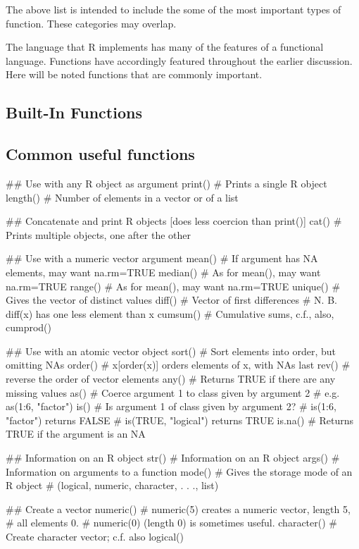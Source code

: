 The above list is intended to include the some of the most important
types of function.  These categories may overlap.

The language that R implements has many of the features
of  a
functional language. Functions have accordingly featured throughout
the earlier discussion.  Here will be noted functions that are
commonly important.

\subsection{Built-In Functions}\label{ss:built-in}

\subsection*{Common useful functions}

\begin{fullwidth}
\begin{verbcode}
## Use with any R object as argument
print()           # Prints a single R object
length()          # Number of elements in a vector or of a list

## Concatenate and print R objects [does less coercion than print()]
cat()             # Prints multiple objects, one after the other

## Use with a numeric vector argument
mean()            # If argument has NA elements, may want na.rm=TRUE
median()          # As for mean(), may want na.rm=TRUE
range()           # As for mean(), may want na.rm=TRUE
unique()          # Gives the vector of distinct values
diff()            # Vector of first differences
                  # N. B. diff(x) has one less element than x
cumsum()          # Cumulative sums, c.f., also, cumprod()

## Use with an atomic vector object
sort()            # Sort elements into order, but omitting NAs
order()           # x[order(x)] orders elements of x, with NAs last
rev()             # reverse the order of vector elements
any()             # Returns TRUE if there are any missing values
as()              # Coerce argument 1 to class given by argument 2
                  # e.g. as(1:6, "factor")
is()              # Is argument 1 of class given by argument 2?
                  # is(1:6, "factor") returns FALSE
                  # is(TRUE, "logical") returns TRUE
is.na()           # Returns TRUE if the argument is an NA

## Information on an R object
str()             # Information on an R object
args()            # Information on arguments to a function
mode()            # Gives the storage mode of an R object
                  # (logical, numeric, character, . . ., list)

## Create a vector
numeric()         # numeric(5) creates a numeric vector, length 5,
                  # all elements 0.
                  # numeric(0) (length 0) is sometimes useful.
character()       # Create character vector; c.f. also logical()
\end{verbcode}
\end{fullwidth}

